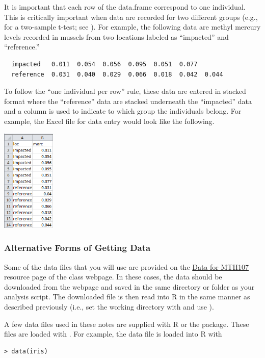 \documentclass[10pt,openany]{book}\usepackage[]{graphicx}\usepackage[]{color}
\makeatletter
\newenvironment{kframe}{%
 \def\at@end@of@kframe{}%
 \ifinner\ifhmode%
  \def\at@end@of@kframe{\end{minipage}}%
  \begin{minipage}{\columnwidth}%
 \fi\fi%
 \def\FrameCommand##1{\hskip\@totalleftmargin \hskip-\fboxsep
 \colorbox{shadecolor}{##1}\hskip-\fboxsep
     \hskip-\linewidth \hskip-\@totalleftmargin \hskip\columnwidth}%
 \MakeFramed {\advance\hsize-\width
   \@totalleftmargin\z@ \linewidth\hsize
   \@setminipage}}%
 {\par\unskip\endMakeFramed%
 \at@end@of@kframe}
\newenvironment{knitrout}{}{} %
\makeatother
\begin{document}
It is important that each row of the data.frame correspond to one individual. This is critically important when data are recorded for two different groups (e.g., for a two-sample t-test; see ). For example, the following data are methyl mercury levels recorded in mussels from two locations labeled as ``impacted'' and ``reference.''
\begin{Verbatim}
  impacted   0.011  0.054  0.056  0.095  0.051  0.077
  reference  0.031  0.040  0.029  0.066  0.018  0.042  0.044
\end{Verbatim}
To follow the ``one individual per row'' rule, these data are entered in stacked format where the ``reference'' data are stacked underneath the ``impacted'' data and a column is used to indicate to which group the individuals belong. For example, the Excel file for data entry would look like the following.

\begin{center}
  \includegraphics[width=1in]{Figs/StackedData.jpg}
\end{center}

\subsubsection*{Alternative Forms of Getting Data} \label{sect:RAltData}
Some of the data files that you will use are provided on the \href{http://derekogle.com/NCMTH107/resources/data_107}{Data for MTH107} resource page of the class webpage. In these cases, the data should be downloaded from the webpage and saved in the same directory or folder as your analysis script. The downloaded file is then read into R in the same manner as described previously (i.e., set the working directory with  and use ).

A few data files used in these notes are supplied with R or the  package. These files are loaded with . For example, the  data file is loaded into R with
\begin{knitrout}
\color{fgcolor}\begin{kframe}
\begin{verbatim}
> data(iris)
\end{verbatim}
\end{kframe}
\end{knitrout}
\end{document}

